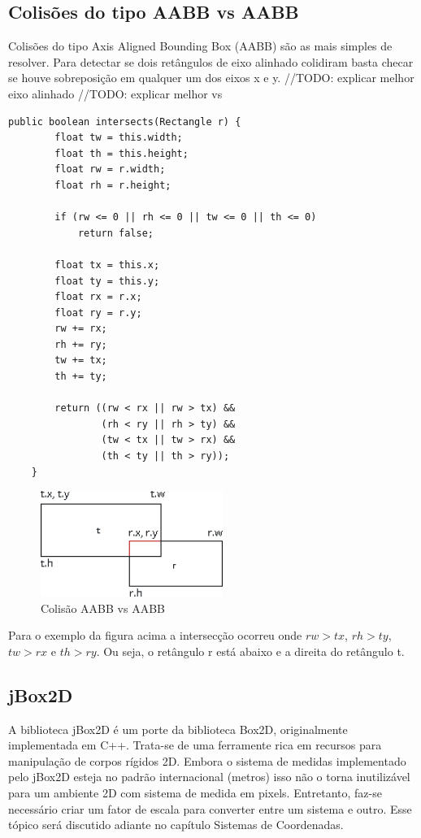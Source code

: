 \documentclass[12pt, 
openright, 
oneside, 
a4paper,    
brazil]{facom-ufu-abntex2}
\begin{document}
\subsection{Colisões do tipo AABB vs AABB}

Colisões do tipo Axis Aligned Bounding Box (AABB) são as mais simples de resolver. Para detectar se dois retângulos de eixo alinhado colidiram basta checar se houve sobreposição em qualquer um dos eixos x e y.
//TODO: explicar melhor eixo alinhado 
//TODO: explicar melhor vs

\begin{lstlisting}[caption=Colisão AABB vs AABB]
	public boolean intersects(Rectangle r) {
    	float tw = this.width;
        float th = this.height;
        float rw = r.width;
        float rh = r.height;
        
        if (rw <= 0 || rh <= 0 || tw <= 0 || th <= 0) 
            return false;
        
        float tx = this.x;
        float ty = this.y;
        float rx = r.x;
        float ry = r.y;
        rw += rx;
        rh += ry;
        tw += tx;
        th += ty;
      
        return ((rw < rx || rw > tx) && 
                (rh < ry || rh > ty) &&
                (tw < tx || tw > rx) && 
                (th < ty || th > ry)); 
    }
\end{lstlisting}


\begin{figure}[H]
	\centering
	\includegraphics[width=16em]{imagens/aabbaabb.png}
	\caption{Colisão AABB vs AABB}
\end{figure}

Para o exemplo da figura acima a intersecção ocorreu onde $rw > tx$, $rh > ty$, $tw > rx$ e $th > ry$. Ou seja, o retângulo r está abaixo e a direita do retângulo t.

\subsection{jBox2D}

A biblioteca jBox2D é um porte da biblioteca Box2D, originalmente implementada em C++. Trata-se de uma ferramente rica em recursos para manipulação de corpos rígidos 2D. Embora o sistema de medidas implementado pelo jBox2D esteja no padrão internacional (metros) isso não o torna inutilizável para um ambiente 2D com sistema de medida em pixels. Entretanto, faz-se necessário criar um fator de escala para converter entre um sistema e outro. Esse tópico será discutido adiante no capítulo Sistemas de Coordenadas.
\end{document}
